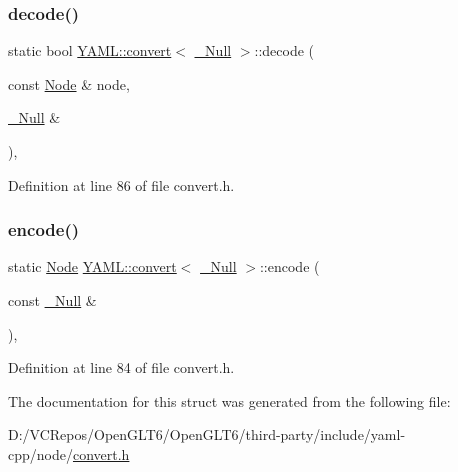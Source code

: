 \subsubsection{\texorpdfstring{decode()}{decode()}}
{\footnotesize\ttfamily static bool \mbox{\hyperlink{struct_y_a_m_l_1_1convert}{Y\+A\+M\+L\+::convert}}$<$ \mbox{\hyperlink{struct_y_a_m_l_1_1___null}{\+\_\+\+Null}} $>$\+::decode (\begin{DoxyParamCaption}\item[{const \mbox{\hyperlink{class_y_a_m_l_1_1_node}{Node}} \&}]{node,  }\item[{\mbox{\hyperlink{struct_y_a_m_l_1_1___null}{\+\_\+\+Null}} \&}]{ }\end{DoxyParamCaption})\hspace{0.3cm}{\ttfamily [inline]}, {\ttfamily [static]}}



Definition at line 86 of file convert.\+h.

\mbox{\label{struct_y_a_m_l_1_1convert_3_01___null_01_4_a85aa96bac5d449722a0367916cf71746}} 
\subsubsection{\texorpdfstring{encode()}{encode()}}
{\footnotesize\ttfamily static \mbox{\hyperlink{class_y_a_m_l_1_1_node}{Node}} \mbox{\hyperlink{struct_y_a_m_l_1_1convert}{Y\+A\+M\+L\+::convert}}$<$ \mbox{\hyperlink{struct_y_a_m_l_1_1___null}{\+\_\+\+Null}} $>$\+::encode (\begin{DoxyParamCaption}\item[{const \mbox{\hyperlink{struct_y_a_m_l_1_1___null}{\+\_\+\+Null}} \&}]{ }\end{DoxyParamCaption})\hspace{0.3cm}{\ttfamily [inline]}, {\ttfamily [static]}}



Definition at line 84 of file convert.\+h.



The documentation for this struct was generated from the following file\+:\begin{DoxyCompactItemize}
\item 
D\+:/\+V\+C\+Repos/\+Open\+G\+L\+T6/\+Open\+G\+L\+T6/third-\/party/include/yaml-\/cpp/node/\mbox{\hyperlink{convert_8h}{convert.\+h}}\end{DoxyCompactItemize}
